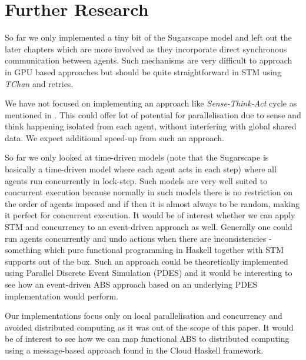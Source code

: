 \section{Further Research} %
\label{sec:further}

So far we only implemented a tiny bit of the Sugarscape model and left out the later chapters which are more involved as they incorporate direct synchronous communication between agents. Such mechanisms are very difficult to approach in GPU based approaches \cite{lysenko_framework_2008} but should be quite straightforward in STM using \textit{TChan} and retries.

We have not focused on implementing an approach like \textit{Sense-Think-Act} cycle as mentioned in \cite{xiao_survey_2018}. This could offer lot of potential for parallelisation due to sense and think happening isolated from each agent, without interfering with global shared data. We expect additional speed-up from such an approach.

So far we only looked at time-driven models (note that the Sugarscape is basically a time-driven model where each agent acts in each step) where all agents run concurrently in lock-step. Such models are very well suited to concurrent execution because  normally in such models there is no restriction on the order of agents imposed and if then it is almost always to be random, making it perfect for concurrent execution. It would be of interest whether we can apply STM and concurrency to an event-driven approach as well. Generally one could run agents concurrently and undo actions when there are inconsistencies - something which pure functional programming in Haskell together with STM supports out of the box. Such an approach could be theoretically implemented using Parallel Discrete Event Simulation (PDES) \cite{fujimoto_parallel_1990} and it would be interesting to see how an event-driven ABS approach based on an underlying PDES implementation would perform.

Our implementations focus only on local parallelisation and concurrency and avoided distributed computing as it was out of the scope of this paper. It would be of interest to see how we can map functional ABS to distributed computing using a message-based approach found in the Cloud Haskell framework.